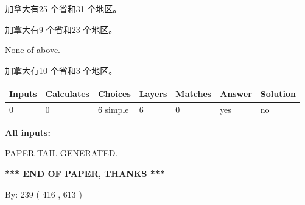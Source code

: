 \documentclass{ctexart}
\begin{document}
 
加拿大有25 个省和31 个地区。
 
 
加拿大有9 个省和23 个地区。
 
 
 None of above.
 
 
\noindent{}
 
 
加拿大有10 个省和3 个地区。
 
 
\noindent{}
 
 
   
   
   
   
\noindent\begin{tabular}{|l|l|l|l|l|l|l|}
 \hline
Inputs & Calculates & Choices & Layers & Matches & Answer & Solution \\ \hline
 0  & 
 0  & 
 6
  simple  
  & 
 6  & 
 0  & 
  yes & 
  no 
  \\ \hline
 \end{tabular}
   
   
   
   
\noindent{}
   
   
   
   
\noindent\vspace{0.1in}\hspace{-0.08in} {\textbf{\Large{All inputs: }}}
   
   
   
   
   
   
 \vspace{0.2in}
 
   
   
\vspace{2.0in} PAPER TAIL GENERATED.
   
   
   
   
\vspace{1.0in} 
{\textbf{\large{ *** END OF PAPER, THANKS *** }}} 
   
   
\hspace{1.0in} By: 
 239 ( 416 ,  613 )
   
   
   
   
\newpage 
\setcounter{page}{ 
   583001 } 
   
   
   
\end{document}
